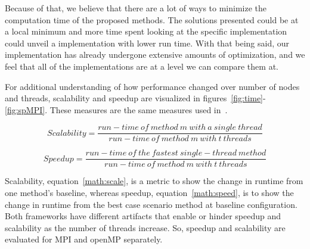 \documentclass[letterpaper,11pt,onecolumn]{article}
\begin{document}
Because of that, we believe that there are a lot of ways to minimize the computation time of the proposed methods. The solutions presented could be at a local minimum and more time spent looking at the specific implementation could unveil a implementation with lower run time. With that being said, our implementation has already undergone extensive amounts of optimization, and we feel that all of the implementations are at a level we can compare them at.

For additional understanding of how performance changed over number of nodes and threads, scalability and speedup are visualized in figures~\ref{fig:time}-\ref{fig:spMPI}. These measures are the same measures used in~\cite{Joyce}.


\begin{center}
  \begin{equation}
	Scalability = \frac{run-time \ of \ method \ m \ with \ a \ single \ thread}{run-time \ of \ method \ m \ with \ t \ threads}
	\label{math:scale}
  \end{equation}
\end{center}

\begin{center}
  \begin{equation}
	Speedup = \frac{run-time \ of \ the \ fastest \ single-thread \ method}{run-time \ of \ method \ m \ with \ t \ threads}
	\label{math:speed}
  \end{equation}
\end{center}

Scalability, equation~\ref{math:scale}, is a metric to show the change in runtime from one method’s baseline, whereas speedup, equation~\ref{math:speed}, is to show the change in runtime from the best case scenario method at baseline configuration. Both frameworks have different artifacts that enable or hinder speedup and scalability as the number of threads increase. So, speedup and scalability are evaluated for MPI and openMP separately. 
\end{document}
